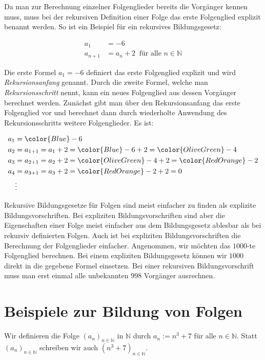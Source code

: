 \documentclass[fontsize=9pt,
               parskip=half-,
               DIV=14,
               listof=chapterentry,
               tocflat]{scrbook}
\begin{document}
Da man zur Berechnung einzelner Folgenglieder bereits die Vorgänger kennen muss, muss bei der rekursiven Definition einer Folge das erste Folgenglied explizit benannt werden. So ist ein Beispiel für ein rekursives Bildungsgesetz:

\begin{align*}
a_{1}&=-6\\a_{n+1}&=a_{n}+2\ {\text{ für alle }}n\in \mathbb {N} 
\end{align*}

Die erste Formel $a_{1}=-6$ definiert das erste Folgenglied explizit und wird \emph{Rekursionsanfang} genannt. Durch die zweite Formel, welche man \emph{Rekursionsschritt} nennt, kann ein neues Folgenglied aus dessen Vorgänger berechnet werden. Zunächst gibt man über den Rekursionsanfang das erste Folgenglied vor und berechnet dann durch wiederholte Anwendung des Rekursionsschritts weitere Folgenglieder. Es ist:

\begin{align*}
a_{1}&={\color {Blue}-6}\\a_{2}&=a_{1+1}=a_{1}+2={\color {Blue}-6}+2={\color {OliveGreen}-4}\\a_{3}&=a_{2+1}=a_{2}+2={\color {OliveGreen}-4}+2={\color {RedOrange}-2}\\a_{4}&=a_{3+1}=a_{3}+2={\color {RedOrange}-2}+2=0\\&\vdots 
\end{align*}

Rekursive Bildungsgesetze für Folgen sind meist einfacher zu finden als explizite Bildungsvorschriften. Bei expliziten Bildungsvorschriften sind aber die Eigenschaften einer Folge meist einfacher aus dem Bildungsgesetz ablesbar als bei rekursiv definierten Folgen. Auch ist bei expliziten Bildungsvorschriften die Berechnung der Folgenglieder einfacher. Angenommen, wir möchten das $1000$-te Folgenglied berechnen. Bei einem expliziten Bildungsgesetz können wir $1000$ direkt in die gegebene Formel einsetzen. Bei einer rekursiven Bildungsvorschrift muss man erst einmal alle unbekannten $998$ Vorgänger ausrechnen.

\section{Beispiele zur Bildung von Folgen}

\begin{example*}
Wir definieren die Folge $(a_{n})_{n\in \mathbb {N} }$ in $\mathbb {N} $ durch $a_{n}:=n^{3}+7$ für alle $n\in \mathbb {N} $. Statt $(a_{n})_{n\in \mathbb {N} }$ schreiben wir auch $(n^{3}+7)_{n\in \mathbb {N} }$.

\end{example*}
\end{document}
